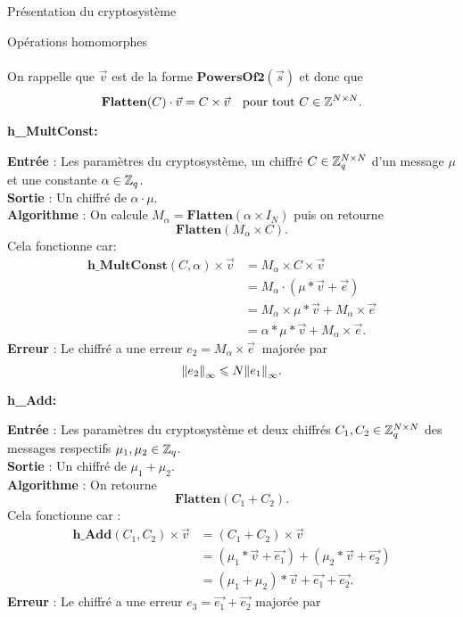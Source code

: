 \begin{section}{Présentation du cryptosystème}
\begin{subsection}{Opérations homomorphes}
\paragraph{}
On rappelle que $\vec{v}$ est de la forme $\textbf{PowersOf2}(\vec{s})$ et donc que
\[\textbf{Flatten}(C) \cdot \vec{v} = C \times \vec{v}\quad \text{pour tout $C\in \mathbb{Z}^{N \times N}$.} \]
	
\vspace{0.5cm}\noindent\textbf{h\_MultConst:}
\flushleft
	
	\textbf{Entrée} : Les paramètres du cryptosystème, un chiffré $C \in \mathbb{Z}_q^{N \times N}$ d'un message $\mu$ et une constante $\alpha \in \mathbb{Z}_q$. \\
	\textbf{Sortie} : Un chiffré de $\alpha \cdot \mu$.\\
	\textbf{Algorithme} : On calcule $M_{\alpha} = \textbf{Flatten}(\alpha \times I_N)$ puis on retourne
	\[\textbf{Flatten}(M_{\alpha} \times C).\]
	Cela fonctionne car:
	\begin{align*}
	\textbf{h\_MultConst}(C, \alpha) \times \vec{v} &= M_{\alpha} \times C \times \vec{v} \\
	&= M_{\alpha} \cdot (\mu * \vec{v} + \vec{e}) \\
	&= M_{\alpha} \times \mu * \vec{v} + M_{\alpha} \times \vec{e} \\
	&= \alpha * \mu * \vec{v} + M_{\alpha} \times \vec{e}.
	\end{align*}
	\textbf{Erreur} : Le chiffré a une erreur $e_2 = M_\alpha \times \vec{e}\:$ majorée par
		\[{\|e_2\|}_{\infty} \leqslant N {\|e_1\|}_{\infty}.\]

\vspace{0.5cm}\noindent\textbf{h\_Add:}
\flushleft
	
	\textbf{Entrée} : Les paramètres du cryptosystème et deux chiffrés $C_1, C_2 \in \mathbb{Z}_q^{N \times N}$ des messages respectifs $\mu_1, \mu_2 \in \mathbb{Z}_q$.\\
	\textbf{Sortie} : Un chiffré de $\mu_1 + \mu_2$.\\
	\textbf{Algorithme} : On retourne 
	\[\textbf{Flatten}(C_1 + C_2).\]
	Cela fonctionne car :
	\begin{align*}
	\textbf{h\_Add}(C_1, C_2) \times \vec{v} &= (C_1 + C_2) \times \vec{v} \\
	&= (\mu_1 * \vec{v} + \vec{e_1}) + (\mu_2 * \vec{v} + \vec{e_2}) \\
	&= (\mu_1 + \mu_2) * \vec{v} + \vec{e_1} + \vec{e_2}.
	\end{align*}
\textbf{Erreur} : Le chiffré a une erreur $e_3 = \vec{e_1} + \vec{e_2}$ majorée par


\end{subsection}
\end{section}
